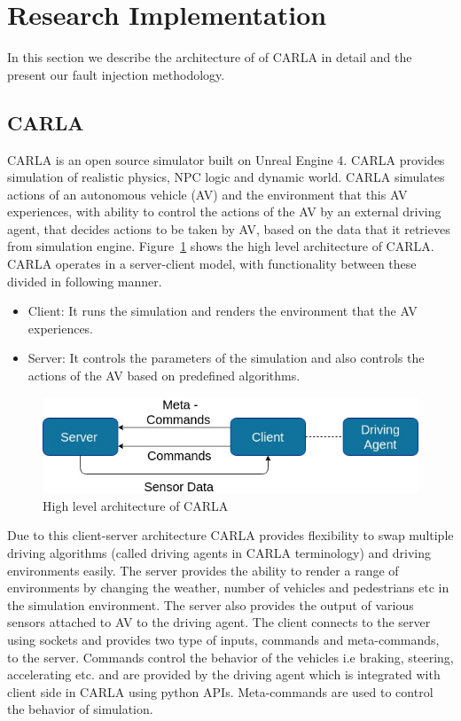\section{Research Implementation} 
In this section we describe the architecture of of CARLA in detail and the present our fault injection methodology. 

\subsection{CARLA} \label{ri-carla}
CARLA is an open source simulator built on Unreal Engine 4. CARLA provides simulation of realistic physics, NPC logic and dynamic world. CARLA simulates actions of an autonomous vehicle (AV) and the environment that this AV experiences, with ability to control the actions of the AV by an external driving agent,  that decides actions to be taken by AV, based on the data that it retrieves from simulation engine. Figure~\ref{fig:carla_arch} shows the high level architecture of CARLA. CARLA operates in a server-client model, with functionality between these divided in following manner.

\begin{itemize}
	\item Client: It runs the simulation and renders the environment that the AV experiences.
	\item Server: It controls the parameters of the simulation and also controls the actions of the AV based on predefined algorithms. 
	
\end{itemize}

\begin{figure}  [h]
	\vspace{-0.5em}
	\centering
	\includegraphics[scale=0.4]{CARLA_block}
	\vspace{-0.5em}
	\caption{High level architecture of CARLA}
	\label{fig:carla_arch}
	\vspace{-1.5em}
\end{figure}

\bigskip

Due to this client-server architecture CARLA provides flexibility to swap multiple driving algorithms (called driving agents in CARLA terminology) and driving environments easily. The server provides the ability to render a range of environments by changing the weather, number of vehicles and pedestrians etc in the simulation environment. The server also provides the output of various sensors attached to AV to the driving agent. The client connects to the server using sockets and provides two type of inputs, commands and meta-commands, to the server. Commands control the behavior of the vehicles i.e braking, steering, accelerating etc. and are provided by the driving agent which is integrated with client side in CARLA using python APIs. Meta-commands are used to control the behavior of simulation.

